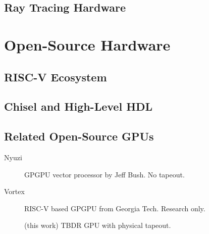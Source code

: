 \subsection{Ray Tracing Hardware}


\section{Open-Source Hardware}

\subsection{RISC-V Ecosystem}


\subsection{Chisel and High-Level HDL}


\subsection{Related Open-Source GPUs}

\begin{description}
  \item[Nyuzi] GPGPU vector processor by Jeff Bush. No tapeout.
  \item[Vortex] RISC-V based GPGPU from Georgia Tech. Research only.
  \item[\borg{}] (this work) TBDR GPU with physical tapeout.
\end{description}
